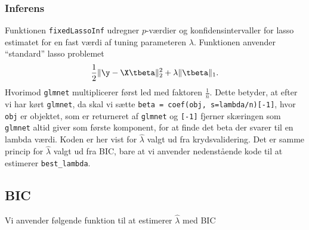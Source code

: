 \subsubsection{Inferens} \label{subsubsec:inferens}
Funktionen \texttt{fixedLassoInf} udregner \(p\)-værdier og konfidensintervaller for lasso estimatet for en fast værdi af tuning parameteren \(\lambda\).
Funktionen anvender ``standard'' lasso problemet
\begin{align*}
\frac{1}{2} \Vert \y - \X \tbeta \Vert_2^2 + \lambda \Vert \tbeta \Vert_1.
\end{align*}
Hvorimod \texttt{glmnet} multiplicerer først led med faktoren \(\frac{1}{n}\).
Dette betyder, at efter vi har kørt \texttt{glmnet}, da skal vi sætte \texttt{beta = coef(obj, s=lambda/n)[-1]}, hvor \texttt{obj} er objektet, som er returneret af \texttt{glmnet} og \texttt{[-1]} fjerner skæringen som \texttt{glmnet} altid giver som første komponent, for at finde det beta der svarer til en lambda værdi.
%
%
Koden er her vist for $\widehat{\lambda}$ valgt ud fra krydsvalidering. Det er samme princip for $\widehat{\lambda}$  valgt ud fra BIC,  bare at vi anvender nedenstående kode til at estimerer \texttt{best\_lambda}.

\subsection{BIC} \label{sub:bic}
Vi anvender følgende funktion til at estimerer $\widehat{\lambda}$ med BIC
